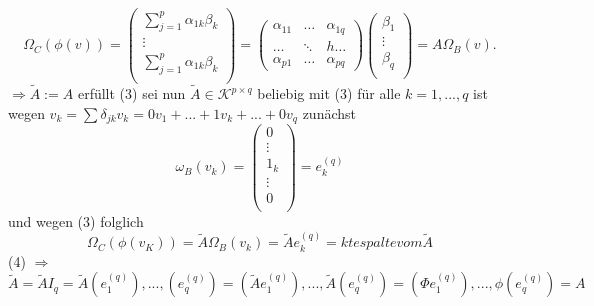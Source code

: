 \documentclass[11pt]{article}
\begin{document}
\[\Omega_C(\phi(v))=
\begin{pmatrix}
 \sum_{j=1}^p\alpha_{1k}\beta_k\\
 \vdots\\
  \sum_{j=1}^p\alpha_{1k}\beta_k\\
\end{pmatrix}
=\begin{pmatrix}
  \alpha_{11}& \hdots & \alpha_{1q}\\
  \hdots&\ddots&h\hdots\\
  \alpha_{p1}&\hdots& \alpha_{pq}
\end{pmatrix}
\begin{pmatrix}
 \beta_1\\
 \vdots\\
 \beta_q\\
\end{pmatrix}
= A\Omega_B(v).
\]$\Rightarrow \tilde{A}:= A$ erfüllt (3) sei nun $\tilde{ A} \in \mathcal{K}^{p\times q}$ beliebig mit (3) 
für alle $k=1,...,q$ ist wegen $v_k= \sum \delta_{jk}v_k= 0v_1+...+1v_k+...+0v_q$
zunächst \[\omega_B (v_k)= 
\begin{pmatrix}
 0\\
 \vdots\\
 1_k\\
 \vdots\\
 0\\
\end{pmatrix}
= e_k^(q)\] und wegen (3) folglich 
\[\Omega_C(\phi(v_K))= \tilde{A} \Omega_B(v_k)=\tilde{A}e_k^(q)= kte spalte vom \tilde{A} \](4)
$\Rightarrow$\\
\[\tilde{A}=\tilde{A}I_q =\tilde{A}(e_1^(q)),...,(e_q^(q))=(\tilde{A}e_1^(q)),...,\tilde{A}(e_q^(q))= (\Phi e_1^(q)),...,\phi(e_q^(q))=A
\]
\end{document}
